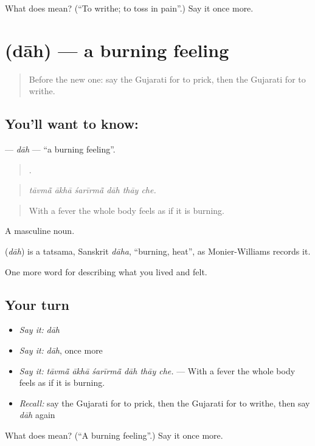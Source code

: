 \begin{tcolorbox}[breakable,colback=teal!4,colframe=teal!35!black,title={Before you move on}]
What does  mean? (\textquotedblleft{}To writhe; to toss in pain\textquotedblright{}.) Say it once more.
\end{tcolorbox}
\section[\texorpdfstring{\gu{દાહ} (dāh)}{દાહ (dāh)}]{ (dāh) — a burning feeling}

\label{lesson:GU-C483-dah}



\begin{quote}
Before the new one: say the Gujarati for to prick, then the Gujarati for to writhe.
\end{quote}

\subsection*{You'll want to know: }
\textbf{} — \emph{dāh} — \textquotedblleft{}a burning feeling\textquotedblright{}.

\begin{quote}
     .
\end{quote}

\begin{quote}
\emph{tāvmā̃ ākhā śarīrmā̃ dāh thāy che.}
\end{quote}

\begin{quote}
With a fever the whole body feels as if it is burning.
\end{quote}

A masculine noun.

\begin{cousinweb}
\textbf{} (\emph{dāh}) is a tatsama, Sanskrit \emph{dāha}, \textquotedblleft{}burning, heat\textquotedblright{}, as Monier-Williams records it.
\end{cousinweb}

\begin{grammarlens}[title={What you've built}]
One more word for describing what you lived and felt.
\end{grammarlens}

\subsection*{Your turn}
\begin{itemize}
\raggedright
  \item \emph{Say it:} \emph{dāh}
  \item \emph{Say it:} \emph{dāh}, once more
  \item \emph{Say it:} \emph{tāvmā̃ ākhā śarīrmā̃ dāh thāy che.} — With a fever the whole body feels as if it is burning.
  \item \emph{Recall:} say the Gujarati for to prick, then the Gujarati for to writhe, then say \emph{dāh} again
\end{itemize}

\begin{tcolorbox}[breakable,colback=teal!4,colframe=teal!35!black,title={Before you move on}]
What does  mean? (\textquotedblleft{}A burning feeling\textquotedblright{}.) Say it once more.
\end{tcolorbox}
